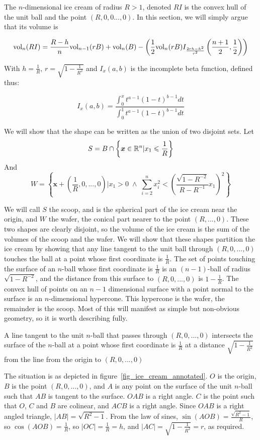 The $n$-dimensional ice cream of radius $R>1$, denoted $RI$ is the convex hull of the unit ball and the point $(R,0,0...,0)$. In this section, we will simply argue that its volume is

$$
\mbox{vol}_n(RI) = \frac{R-h}{n} \mbox{vol}_{n-1}(rB) + \mbox{vol}_n(B) - \left(\frac{1}{2}\mbox{vol}_n(rB) I_{\frac{2rh-h^2}{r^2}}\left(\frac{n+1}{2}, \frac{1}{2}\right)\right)
$$

With $h = \frac{1}{R}$, $r = \sqrt{1-\frac{1}{R^2}}$ and $I_x(a,b)$ is the incomplete beta function, defined thus:

$$
I_x(a,b) = \frac{\int^x_0 t^{a-1}(1-t)^{b-1}dt}{\int^1_0 t^{a-1}(1-t)^{b-1} dt}
$$

We will show that the shape can be written as the union of two disjoint sets. Let
$$
S = B \cap \left\{\bm{x} \in \mathbb{R}^n | x_1 \leqslant \frac{1}{R}\right\}
$$
And
$$
W = \left\{\bm{x} + \left(\frac{1}{R}, 0, ..., 0\right) | x_1 > 0 \; \wedge \; \sum^{n}_{i=2} x_i^2 < \left(\frac{\sqrt{1-R^{-2}}}{R-R^{-1}} x_1\right)^2 \right\}
$$

We will call $S$ the scoop, and is the spherical part of the ice cream near the origin, and $W$ the wafer, the conical part nearer to the point $(R,...,0)$. These two shapes are clearly disjoint, so the volume of the ice cream is the sum of the volumes of the scoop and the wafer. We will show that these shapes partition the ice cream by showing that any line tangent to the unit ball through $(R,0,...,0)$ touches the ball at a point whose first coordinate is $\frac{1}{R}$.  The set of points touching the surface of an $n$-ball whose first coordinate is $\frac{1}{R}$ is an $(n-1)$-ball of radius $\sqrt{1-R^{-2}}$, and the distance from this surface to $(R,0,...,0)$ is $1-\frac{1}{R}$. The convex hull of points on an $n-1$ dimensional surface with a point normal to the surface is an $n$-dimensional hypercone. This hypercone is the wafer, the remainder is the scoop. Most of this will manifest as simple but non-obvious geometry, so it is worth describing fully.

\begin{proposition}
A line tangent to the unit $n$-ball that passes through $(R,0,...,0)$ intersects the surface of the $n$-ball at a point whose first coordinate is $\frac{1}{R}$ at a distance $\sqrt{1-\frac{1}{R^2}}$ from the line from the origin to $(R,0,...,0)$
\end{proposition}

The situation is as depicted in figure~\ref{fig_ice_cream_annotated}. $O$ is the origin, $B$ is the point $(R,0,...,0)$, and $A$ is any point on the surface of the unit $n$-ball such that $AB$ is tangent to the surface. $OAB$ is a right angle. $C$ is the point such that $O$, $C$ and $B$ are colinear, and $ACB$ is a right angle. Since $OAB$ is a right angled triangle, $|AB| = \sqrt{R^2-1}$. From the law of sines, $\sin(AOB) = \frac{\sqrt{R^2-1}}{R}$, so $\cos(AOB) = \frac{1}{R}$, so $|OC| = \frac{1}{R} = h$, and $|AC| = \sqrt{1-\frac{1}{R^2}} = r$, as required.

